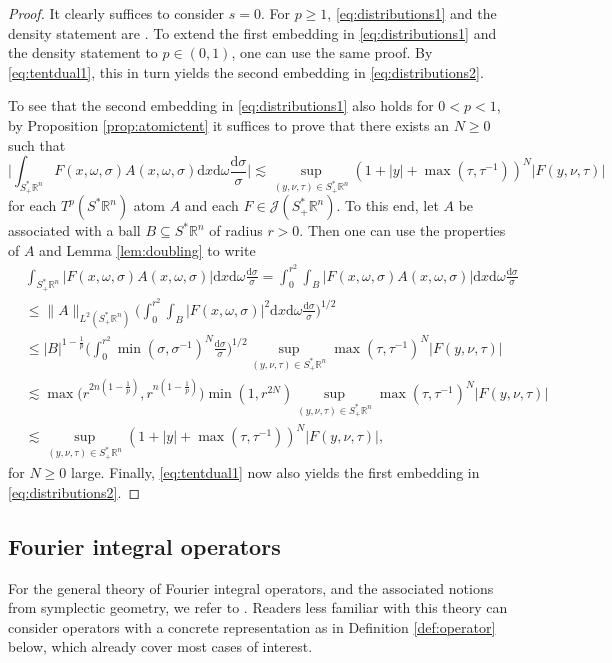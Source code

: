 \documentclass{amsart}
\newcommand {\ud}{\mathrm{d}}
\newcommand {\J}{\mathcal{J}}
\newcommand {\Rn}{\mathbb{R}^{n}}
\newcommand {\Sp}{S^{*}\Rn}
\newcommand {\Spp}{S^{*}_{+}\Rn}
\newcommand {\w}{\omega}
\theoremstyle{definition}
\numberwithin{equation}{section}
\begin{document}
\begin{proof}
It clearly suffices to consider $s=0$. For $p\geq 1$, \eqref{eq:distributions1} and the density statement are  \cite[Lemma 2.10]{HaPoRo20}. To extend the first embedding in \eqref{eq:distributions1} and the density statement to $p\in(0,1)$, one can use the same proof.  By \eqref{eq:tentdual1}, this in turn yields the second embedding in \eqref{eq:distributions2}.

To see that the second embedding in \eqref{eq:distributions1} also holds for $0<p<1$, by Proposition \ref{prop:atomictent} it suffices to prove that there exists an $N\geq 0$ such that
\[
\Big|\int_{\Spp}\!F(x,\w,\sigma)A(x,\w,\sigma)\ud x\ud\w\frac{\ud\sigma}{\sigma}\Big|\!\lesssim \!\sup_{(y,\nu,\tau)\in\Spp}\!(1+|y|+\max(\tau,\tau^{-1}))^{N}|F(y,\nu,\tau)| 
\]
for each $T^{p}(\Sp)$ atom $A$ and each $F\in\J(\Spp)$. To this end, let $A$ be associated with a ball $B\subseteq\Sp$ of radius $r>0$. Then one can use the properties of $A$ and Lemma \ref{lem:doubling} to write
\begin{align*}
&\int_{\Spp}|F(x,\w,\sigma)A(x,\w,\sigma)|\ud x\ud\w\frac{\ud\sigma}{\sigma}=\int_{0}^{r^{2}}\int_{B}|F(x,\w,\sigma)A(x,\w,\sigma)|\ud x\ud\w\frac{\ud\sigma}{\sigma}\\
&\leq \|A\|_{L^{2}(\Spp)}\Big(\int_{0}^{r^{2}}\int_{B}|F(x,\w,\sigma)|^{2}\ud x\ud\w\frac{\ud\sigma}{\sigma}\Big)^{1/2}\\
&\leq {|B|^{1-\frac{1}{p}}}\Big(\int_{0}^{r^{2}}\min(\sigma,\sigma^{-1})^{N}\frac{\ud\sigma}{\sigma}\Big)^{1/2}\sup_{(y,\nu,\tau)\in\Spp}\max(\tau,\tau^{-1})^{N}|F(y,\nu,\tau)|\\
&\lesssim \max\big(r^{2n(1-\frac{1}{p})},r^{n(1-\frac{1}{p})}\big)\min(1,r^{2N})\sup_{(y,\nu,\tau)\in\Spp}\max(\tau,\tau^{-1})^{N}|F(y,\nu,\tau)|\\
&\lesssim \sup_{(y,\nu,\tau)\in\Spp}(1+|y|+\max(\tau,\tau^{-1}))^{N}|F(y,\nu,\tau)|,
\end{align*}
for $N\geq0$ large. Finally, \eqref{eq:tentdual1} now also yields the first embedding in \eqref{eq:distributions2}.
\end{proof}


\subsection{Fourier integral operators}\label{subsec:FIOs}

For the general theory of Fourier integral operators, and the associated notions from symplectic geometry, we refer to \cite{Hormander09,Duistermaat11,Sogge17}. Readers less familiar with this theory can consider operators with a concrete representation as in Definition \ref{def:operator} below, which already cover most cases of interest.
\end{document}
